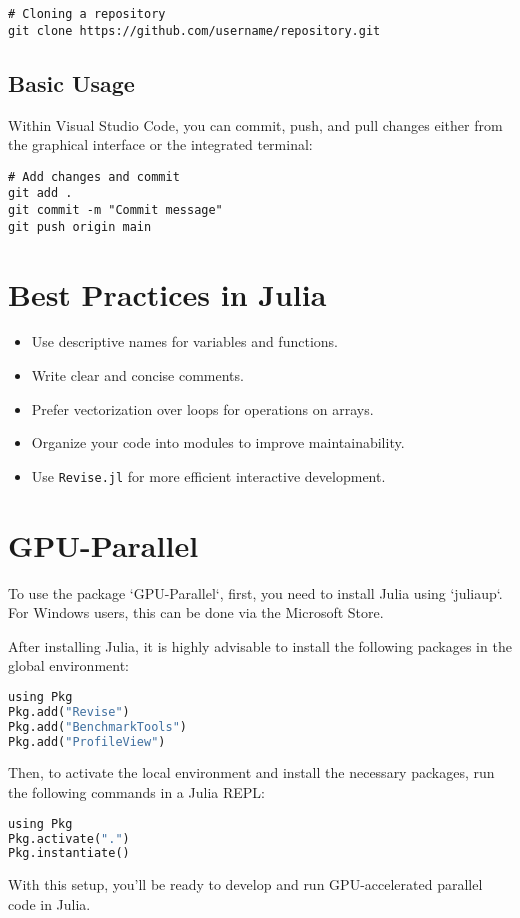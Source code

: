 \documentclass[a4paper,12pt]{article}
\begin{document}
\begin{lstlisting}
# Cloning a repository
git clone https://github.com/username/repository.git
\end{lstlisting}

\subsection{Basic Usage}

Within Visual Studio Code, you can commit, push, and pull changes either from the graphical interface or the integrated terminal:

\begin{lstlisting}
# Add changes and commit
git add .
git commit -m "Commit message"
git push origin main
\end{lstlisting}

\section{Best Practices in Julia}

\begin{itemize}
    \item Use descriptive names for variables and functions.
    \item Write clear and concise comments.
    \item Prefer vectorization over loops for operations on arrays.
    \item Organize your code into modules to improve maintainability.
    \item Use \texttt{Revise.jl} for more efficient interactive development.
\end{itemize}

\section{GPU-Parallel}

To use the package `GPU-Parallel`, first, you need to install Julia using `juliaup`. For Windows users, this can be done via the Microsoft Store.

After installing Julia, it is highly advisable to install the following packages in the global environment:

\begin{lstlisting}[language=Python]
using Pkg
Pkg.add("Revise")
Pkg.add("BenchmarkTools")
Pkg.add("ProfileView")
\end{lstlisting}

Then, to activate the local environment and install the necessary packages, run the following commands in a Julia REPL:

\begin{lstlisting}[language=Python]
using Pkg
Pkg.activate(".")
Pkg.instantiate()
\end{lstlisting}

With this setup, you'll be ready to develop and run GPU-accelerated parallel code in Julia.
\end{document}
